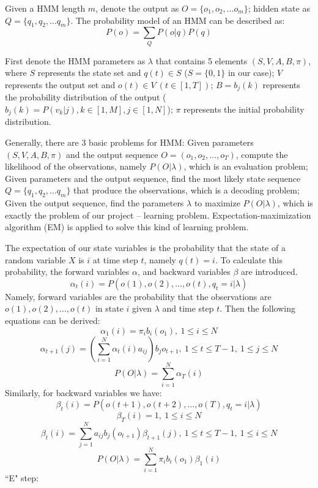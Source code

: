 \documentclass[conference]{IEEEtran}
\begin{document}
Given a HMM length $m$, denote the output as $O=\{o_1, o_2,\dots o_m\}$; hidden state as $Q=\{q_1, q_2,\dots q_m\}$. The probability model of an HMM can be described as:
\begin{equation}
P(o)=\sum_{Q}P(o|q)P(q)
\end{equation}

First denote the HMM parameters as $\lambda$ that contains 5 elements $(S,V,A,B,\pi)$, where $S$ represents the state set and $q(t)\in S$ ($S=\{0,1\}$ in our case); $V$ represents the output set and $o(t)\in V\ (t\in[1,T])$; $B=b_j(k)$ represents the probability distribution of the output ($b_j(k)=P(v_k|j),k\in[1,M],j\in[1,N]$); $\pi$ represents the initial probability distribution.

Generally, there are 3 basic problems for HMM\cite{hmm4}: Given parameters $(S,V,A,B,\pi)$ and the output sequence $O=(o_1,o_2,\dots,o_T)$, compute the likelihood of the observations, namely $P(O|\lambda)$, which is an evaluation problem; Given parameters and the output sequence, find the most likely state sequence $Q=\{q_1, q_2,\dots q_m\}$ that produce the observations, which is a decoding problem; Given the output sequence, find the parameters $\lambda$ to maximize $P(O|\lambda)$, which is exactly the problem of our project -- learning problem. Expectation-maximization algorithm (EM) is applied to solve this kind of learning problem.

The expectation of our state variables is the probability that the state of a random variable $X$ is $i$ at time step $t$, namely $q(t)=i$. To calculate this probability, the forward variables $\alpha$, and backward variables $\beta$ are introduced.
\begin{equation}
\alpha_t(i)=P(o(1),o(2),\dots,o(t),q_t=i|\lambda)
\end{equation}
Namely, forward variables are the probability that the observations are $o(1),o(2),\dots,o(t)$ in state $i$ given $\lambda$ and time step $t$. Then the following equations can be derived:
\begin{equation}
\alpha_1(i)=\pi_ib_i(o_1),\ 1\leq i\leq N
\end{equation}
\begin{equation}
\alpha_{t+1}(j)=(\sum_{i=1}^N\alpha_t(i)a_{ij})b_jo_{t+1}, \ 1\leq t\leq T-1,\ 1\leq j\leq N
\end{equation}
\begin{equation}
P(O|\lambda)=\sum_{i=1}^N\alpha_T(i)
\end{equation}
Similarly, for backward variables we have:
\begin{equation}
\beta_t(i)=P(o(t+1),o(t+2),\dots,o(T),q_t=i|\lambda)
\end{equation}
\begin{equation}
\beta_T(i)=1,\ 1\leq i\leq N
\end{equation}
\begin{equation}
\beta_t(i)=\sum_{j=1}^Na_{ij}b_j(o_{t+1})\beta_{t+1}(j),\ 1\leq t\leq T-1,\ 1\leq i\leq N
\end{equation}
\begin{equation}
P(O|\lambda)=\sum_{i=1}^N\pi_ib_i(o_1)\beta_1(i)
\end{equation}
``E" step:
\end{document}

